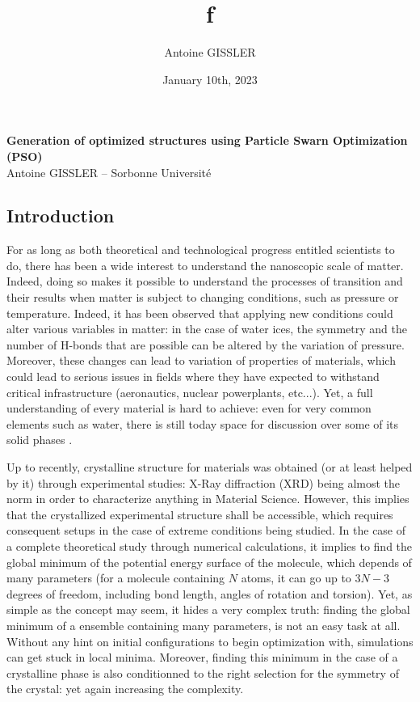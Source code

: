 \documentclass[11pt]{article}
\title{\textsf{\textbf{f}}}
\author{Antoine GISSLER}
\date{January 10th, 2023}
\begin{document}
\noindent\huge\textbf{\textsf{Generation of optimized structures using Particle Swarn Optimization (PSO)}}\normalsize\vspace{1em}\\
\large \textsf{Antoine GISSLER -- Sorbonne Université}
\begin{multicols}{2}
\section*{Introduction}

For as long as both theoretical and technological progress entitled scientists to do, there has been a wide interest to understand the nanoscopic scale of matter. Indeed, doing so makes it possible to understand the processes of transition and their results when matter is subject to changing conditions, such as pressure or temperature. Indeed, it has been observed that applying new conditions could alter various variables in matter: in the case of water ices, the symmetry and the number of H-bonds that are possible can be altered by the variation of pressure. Moreover, these changes can lead to variation of properties of materials, which could lead to serious issues in fields where they have expected to withstand critical infrastructure (aeronautics, nuclear powerplants, etc...). Yet, a full understanding of every material is hard to achieve: even for very common elements such as water, there is still today space for discussion over some of its solid phases \cite{Hansen2021-bk}.

Up to recently, crystalline structure for materials was obtained (or at least helped by it) through experimental studies: X-Ray diffraction (XRD) being almost the norm in order to characterize anything in Material Science. However, this implies that the crystallized experimental structure shall be accessible, which requires consequent setups in the case of extreme conditions being studied. In the case of a complete theoretical study through numerical calculations, it implies to find the global minimum of the potential energy surface of the molecule, which depends of many parameters (for a molecule containing $N$ atoms, it can go up to $3N-3$ degrees of freedom, including bond length, angles of rotation and torsion). Yet, as simple as the concept may seem, it hides a very complex truth: finding the global minimum of a ensemble containing many parameters, is not an easy task at all. Without any hint on initial configurations to begin optimization with, simulations can get stuck in local minima. Moreover, finding this minimum in the case of a crystalline phase is also conditionned to the right selection for the symmetry of the crystal: yet again increasing the complexity.\vspace{1em}


\end{multicols}
\end{document}

